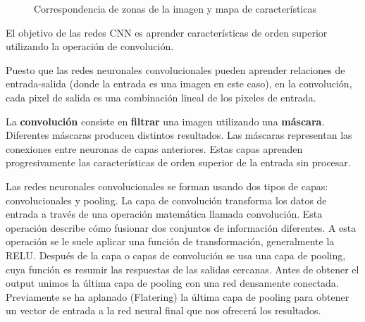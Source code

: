 \documentclass[
  a4paper,
  DIV=11,
  numbers=noendperiod]{scrreprt}
\begin{document}
\begin{figure}


\caption{\label{fig-correspondencia-features}Correspondencia de zonas de
la imagen y mapa de características}

\end{figure}%

El objetivo de las redes CNN es aprender características de orden
superior utilizando la operación de convolución.

Puesto que las redes neuronales convolucionales pueden aprender
relaciones de entrada-salida (donde la entrada es una imagen en este
caso), en la convolución, cada pixel de salida es una combinación lineal
de los pixeles de entrada.

La \textbf{convolución} consiste en \textbf{filtrar} una imagen
utilizando una \textbf{máscara}. Diferentes máscaras producen distintos
resultados. Las máscaras representan las conexiones entre neuronas de
capas anteriores. Estas capas aprenden progresivamente las
características de orden superior de la entrada sin procesar.

Las redes neuronales convolucionales se forman usando dos tipos de
capas: convolucionales y pooling. La capa de convolución transforma los
datos de entrada a través de una operación matemática llamada
convolución. Esta operación describe cómo fusionar dos conjuntos de
información diferentes. A esta operación se le suele aplicar una función
de transformación, generalmente la RELU. Después de la capa o capas de
convolución se usa una capa de pooling, cuya función es resumir las
respuestas de las salidas cercanas. Antes de obtener el output unimos la
última capa de pooling con una red densamente conectada. Previamente se
ha aplanado (Flatering) la última capa de pooling para obtener un vector
de entrada a la red neural final que nos ofrecerá los resultados.
\end{document}
